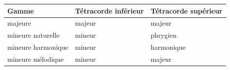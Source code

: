 
\begin{tabular}{@{}l l l@{}}
\toprule
\textbf{Gamme} & \textbf{Tétracorde inférieur} & \textbf{Tétracorde supérieur} \\
\midrule
majeure & majeur & majeur \\
mineure naturelle & mineur & phrygien \\
mineure harmonique & mineur & harmonique \\
mineure mélodique & mineur & majeur \\
\bottomrule
\end{tabular}

